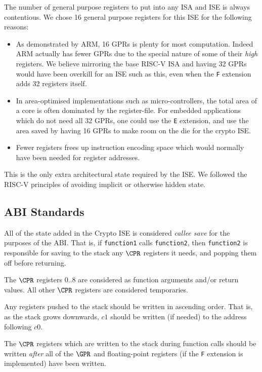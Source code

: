 The number of general purpose registers to put into any ISA and ISE is
always contentious.
We chose 16 general purpose registers for this ISE for the following reasons:

\begin{itemize}
\item As demonstrated by ARM, 16 GPRs is plenty for most computation.
Indeed ARM actually has fewer GPRs due to the special nature of some of their
{\em high} registers.
We believe mirroring the base RISC-V ISA and having
32 GPRs would have been overkill for an ISE such as this, even when the
{\tt F} extension adds 32 registers itself.
\item In area-optimised implementations such as micro-controllers, the
total area of a core is often dominated by the register-file.
For embedded applications which do not need all 32 GPRs, one could use the 
{\tt E} extension, and use the area saved by having 16 GPRs to make room
on the die for the crypto ISE.
\item Fewer registers frees up instruction encoding space which would
normally have been needed for register addresses.
\end{itemize}

This is the only extra architectural state required by the ISE.
We followed the RISC-V principles of avoiding implicit or otherwise
hidden state.

\subsection{ABI Standards}

All of the state added in the Crypto ISE is considered {\em callee save}
for the purposes of the ABI.
That is, if {\tt function1} calls 
{\tt function2}, then {\tt function2} is responsible for saving to the
stack any $\CPR$ registers it needs, and popping them off before returning.

The $\CPR$ registers $0..8$ are considered as function arguments
and/or return values. 
All other $\CPR$ registers are considered temporaries.

Any registers pushed to the stack should be written in ascending order.
That is, as the stack grows downwards, $c1$ should be written (if needed)
to the address following $c0$.

The $\CPR$ registers which are written to the stack during function calls
should be written {\em after} all of the $\GPR$ and floating-point registers
(if the {\tt F} extension is implemented) have been written.
